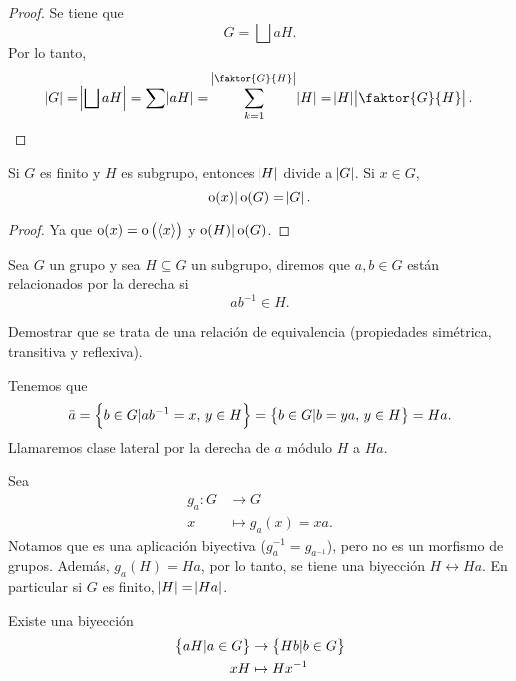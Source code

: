 \begin{proof}
    Se tiene que
    \[
        G = \bigsqcup aH.
    \]
    Por lo tanto,
    \[
        \abs{G} = \abs{\bigsqcup aH} = \sum \abs{aH} = \sum^{\abs{\faktor{G}{H}}}_{k = 1} \abs{H} = \abs{H} \abs{\faktor{G}{H}}.
    \]
\end{proof}

\begin{col}
    Si $G$ es finito y $H$ es subgrupo, entonces $\abs{H}$ divide a $\abs{G}$. Si $x \in G$,
    \[
        \operatorname{o}(x) \vert \operatorname{o}(G) = \abs{G}.
    \]
\end{col}

\begin{proof}
    Ya que $\operatorname{o}(x) = \operatorname{o}\left( \left< x \right> \right)$ y $\operatorname{o}(H) \vert \operatorname{o}(G)$.
\end{proof}

\begin{defi}
    Sea $G$ un grupo y sea $H \subseteq G$ un subgrupo, diremos que $a, b \in G$ están relacionados
    por la derecha si
    \[
        ab^{-1} \in H.
    \]
\end{defi}

\begin{ej}
    Demostrar que se trata de una relación de equivalencia (propiedades simétrica, transitiva y reflexiva).
\end{ej}

\begin{defi}
    Tenemos que
    \[
        \bar{a} = \left\{b \in G \vert ab^{-1} = x, \, y \in H\right\} = \left\{b \in G \vert b = ya, \, y \in H\right\} = Ha.
    \]
    Llamaremos clase lateral por la derecha de $a$ módulo $H$ a $Ha$.
\end{defi}

\begin{obs}
    Sea
    \[
        \begin{aligned}
            g_a \colon G &\to G \\
            x &\mapsto g_a(x) = xa.
        \end{aligned}
    \]
    Notamos que es una aplicación biyectiva ($g^{-1}_a = g_{a^{-1}}$), pero no es un morfismo de grupos.
    Además, $g_a(H) = Ha$, por lo tanto, se tiene una biyección $H \leftrightarrow Ha$. En particular si
    $G$ es finito, $\abs{H} = \abs{Ha}$.
\end{obs}

\begin{prop}
    Existe una biyección
    \[
        \begin{aligned}
            \left\{aH \vert a \in G\right\} &\to \left\{Hb \vert b \in G\right\} \\
            xH &\mapsto Hx^{-1}
        \end{aligned}
    \]
\end{prop}

